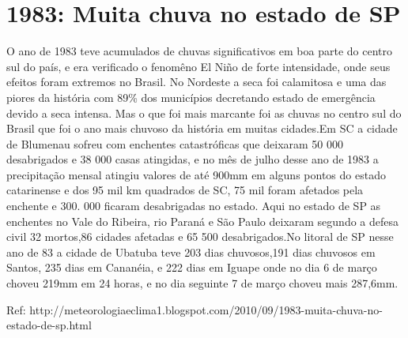 \documentclass[11pt]{article}
\begin{document}
    \section{1983: Muita chuva no estado de
SP}\label{muita-chuva-no-estado-de-sp}

O ano de 1983 teve acumulados de chuvas significativos em boa parte do
centro sul do país, e era verificado o fenomêno El Niño de forte
intensidade, onde seus efeitos foram extremos no Brasil. No Nordeste a
seca foi calamitosa e uma das piores da história com 89\% dos municípios
decretando estado de emergência devido a seca intensa. Mas o que foi
mais marcante foi as chuvas no centro sul do Brasil que foi o ano mais
chuvoso da história em muitas cidades.Em SC a cidade de Blumenau sofreu
com enchentes catastróficas que deixaram 50 000 desabrigados e 38 000
casas atingidas, e no mês de julho desse ano de 1983 a precipitação
mensal atingiu valores de até 900mm em alguns pontos do estado
catarinense e dos 95 mil km quadrados de SC, 75 mil foram afetados pela
enchente e 300. 000 ficaram desabrigadas no estado. Aqui no estado de SP
as enchentes no Vale do Ribeira, rio Paraná e São Paulo deixaram segundo
a defesa civil 32 mortos,86 cidades afetadas e 65 500 desabrigados.No
litoral de SP nesse ano de 83 a cidade de Ubatuba teve 203 dias
chuvosos,191 dias chuvosos em Santos, 235 dias em Cananéia, e 222 dias
em Iguape onde no dia 6 de março choveu 219mm em 24 horas, e no dia
seguinte 7 de março choveu mais 287,6mm.

Ref:
http://meteorologiaeclima1.blogspot.com/2010/09/1983-muita-chuva-no-estado-de-sp.html
\end{document}
